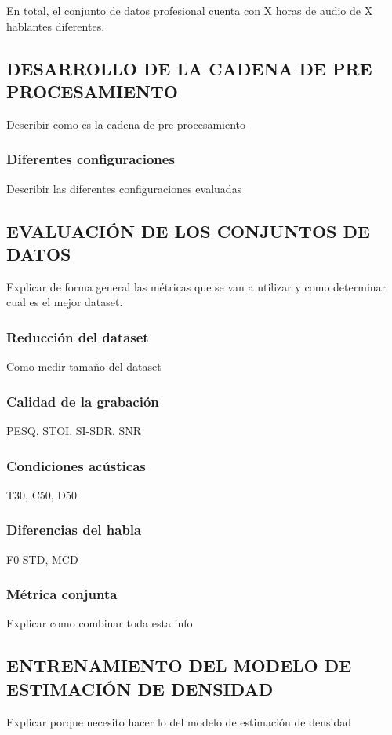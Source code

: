 En total, el conjunto de datos profesional cuenta con X horas de audio de X hablantes diferentes.

\subsection{DESARROLLO DE LA CADENA DE PRE PROCESAMIENTO}
Describir como es la cadena de pre procesamiento

\subsubsection{Diferentes configuraciones}
Describir las diferentes configuraciones evaluadas

\subsection{EVALUACIÓN DE LOS CONJUNTOS DE DATOS}
Explicar de forma general las métricas que se van a utilizar y como determinar cual es el mejor dataset.

\subsubsection{Reducción del dataset}
Como medir tamaño del dataset

\subsubsection{Calidad de la grabación}
PESQ, STOI, SI-SDR, SNR

\subsubsection{Condiciones acústicas}
T30, C50, D50

\subsubsection{Diferencias del habla}
F0-STD, MCD

\subsubsection{Métrica conjunta}
Explicar como combinar toda esta info

\subsection{ENTRENAMIENTO DEL MODELO DE ESTIMACIÓN DE DENSIDAD}
Explicar porque necesito hacer lo del modelo de estimación de densidad

